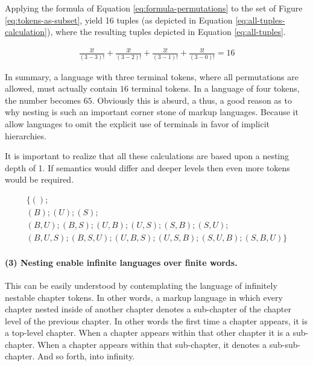 \documentclass{scrreprt}
\begin{document}
Applying the formula of Equation \ref{eq:formula-permutations} to the set of Figure \ref{eq:tokens-as-subset}, yield 16 tuples (as depicted in Equation \ref{eq:all-tuples-calculation}), where the resulting tuples depicted in Equation \ref{eq:all-tuples}.



\begin{equation}
\begin{split}
\frac{3!}{(3-3)!} + \frac{3!}{(3-2)!} + \frac{3!}{(3-1)!} + \frac{3!}{(3-0)!} = 
16
\label{eq:all-tuples-calculation}
\end{split}
\end{equation}



In summary, a language with three terminal tokens, where all permutations are allowed, must actually contain $16$ terminal tokens. In a language of four tokens, the number becomes $65$. Obviously this is absurd, a thus, a good reason as to why nesting is such an important corner stone of markup languages. Because it allow languages to omit the explicit use of terminals in favor of implicit hierarchies.

It is important to realize that all these calculations are based upon a nesting depth of 1. If semantics would differ and deeper levels then even more tokens would be required.




\begin{equation}
\begin{split}
\{
(); \\
(B);
(U);
(S); \\
(B,U);
(B,S);
(U,B);
(U,S);
(S,B);
(S,U); \\
(B,U,S);
(B,S,U);
(U,B,S);
(U,S,B);
(S,U,B);
(S,B,U)
\}
\label{eq:all-tuples}
\end{split}
\end{equation}






\paragraph{(3) Nesting enable infinite languages over finite words.}
This can be easily understood by contemplating the language of infinitely nestable chapter tokens. In other words, a markup language in which every chapter nested inside of another chapter denotes a sub-chapter of the chapter level of the previous chapter. In other words the first time a chapter appears, it is a top-level chapter. When a chapter appears within that other chapter it is a sub-chapter. When a chapter appears within that sub-chapter, it denotes a sub-sub-chapter. And so forth, into infinity.
\end{document}
